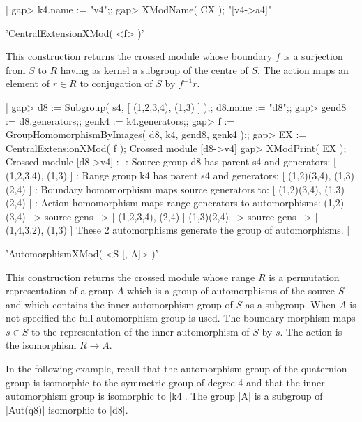 |    gap> k4.name := "v4";;
    gap> XModName( CX );
    "[v4->a4]"           |

%

'CentralExtensionXMod( <f> )'

This construction returns the crossed module whose boundary $f$
is a surjection from $S$ to $R$ having as kernel a subgroup of
the centre of $S$.  
The action maps an element of $r \in R$ to conjugation of $S$ by $f^{-1}r$.

|    gap> d8 := Subgroup( s4, [ (1,2,3,4), (1,3) ] );; d8.name := "d8";;
    gap> gend8 := d8.generators;; genk4 := k4.generators;;
    gap> f := GroupHomomorphismByImages( d8, k4, gend8, genk4 );;
    gap> EX := CentralExtensionXMod( f );
    Crossed module [d8->v4] 
    gap> XModPrint( EX );
    Crossed module [d8->v4] :-
    : Source group d8 has parent s4 and generators:
      [ (1,2,3,4), (1,3) ]
    : Range group k4 has parent s4 and generators:
      [ (1,2)(3,4), (1,3)(2,4) ]
    : Boundary homomorphism maps source generators to:
      [ (1,2)(3,4), (1,3)(2,4) ]
    : Action homomorphism maps range generators to automorphisms:
      (1,2)(3,4) --> { source gens --> [ (1,2,3,4), (2,4) ] }
      (1,3)(2,4) --> { source gens --> [ (1,4,3,2), (1,3) ] }
    These 2 automorphisms generate the group of automorphisms.   |

%

'AutomorphismXMod( <S [, A]> )'

This construction returns the crossed module whose 
range $R$ is a permutation representation of a group $A$
which is a group of automorphisms of the source $S$
and which contains the inner automorphism group of  $S$
as a subgroup.
When  $A$  is not specified the full automorphism group is used.
The boundary morphism maps  $s \in S$  to the representation of the 
inner automorphism of  $S$  by  $s$. 
The action is the isomorphism  $R \to A$.

In the following example, recall that the automorphism group of the
quaternion group is isomorphic to the symmetric group of degree 4
and that the inner automorphism group is isomorphic to |k4|.
The group |A| is a subgroup of |Aut(q8)| isomorphic to |d8|.

